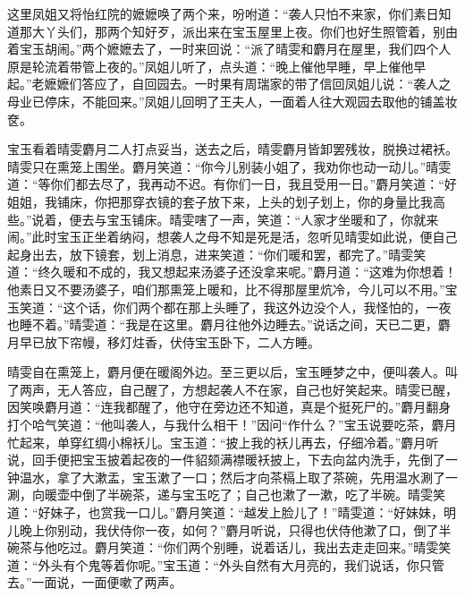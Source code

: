 这里凤姐又将怡红院的嬷嬷唤了两个来，吩咐道：``袭人只怕不来家，你们素日知道那大丫头们，那两个知好歹，派出来在宝玉屋里上夜。你们也好生照管着，别由着宝玉胡闹。''两个嬷嬷去了，一时来回说：``派了晴雯和麝月在屋里，我们四个人原是轮流着带管上夜的。''凤姐儿听了，点头道：``晚上催他早睡，早上催他早起。''老嬷嬷们答应了，自回园去。一时果有周瑞家的带了信回凤姐儿说：``袭人之母业已停床，不能回来。''凤姐儿回明了王夫人，一面着人往大观园去取他的铺盖妆奁。

宝玉看着晴雯麝月二人打点妥当，送去之后，晴雯麝月皆卸罢残妆，脱换过裙袄。晴雯只在熏笼上围坐。麝月笑道：``你今儿别装小姐了，我劝你也动一动儿。''晴雯道：``等你们都去尽了，我再动不迟。有你们一日，我且受用一日。''麝月笑道：``好姐姐，我铺床，你把那穿衣镜的套子放下来，上头的划子划上，你的身量比我高些。''说着，便去与宝玉铺床。晴雯嗐了一声，笑道：``人家才坐暖和了，你就来闹。''此时宝玉正坐着纳闷，想袭人之母不知是死是活，忽听见晴雯如此说，便自己起身出去，放下镜套，划上消息，进来笑道：``你们暖和罢，都完了。''晴雯笑道：``终久暖和不成的，我又想起来汤婆子还没拿来呢。''麝月道：``这难为你想着！他素日又不要汤婆子，咱们那熏笼上暖和，比不得那屋里炕冷，今儿可以不用。''宝玉笑道：``这个话，你们两个都在那上头睡了，我这外边没个人，我怪怕的，一夜也睡不着。''晴雯道：``我是在这里。麝月往他外边睡去。''说话之间，天已二更，麝月早已放下帘幔，移灯炷香，伏侍宝玉卧下，二人方睡。

晴雯自在熏笼上，麝月便在暖阁外边。至三更以后，宝玉睡梦之中，便叫袭人。叫了两声，无人答应，自己醒了，方想起袭人不在家，自己也好笑起来。晴雯已醒，因笑唤麝月道：``连我都醒了，他守在旁边还不知道，真是个挺死尸的。''麝月翻身打个哈气笑道：``他叫袭人，与我什么相干！''因问``作什么？''宝玉说要吃茶，麝月忙起来，单穿红绸小棉袄儿。宝玉道：``披上我的袄儿再去，仔细冷着。''麝月听说，回手便把宝玉披着起夜的一件貂颏满襟暖袄披上，下去向盆内洗手，先倒了一钟温水，拿了大漱盂，宝玉漱了一口；然后才向茶槅上取了茶碗，先用温水涮了一涮，向暖壶中倒了半碗茶，递与宝玉吃了；自己也漱了一漱，吃了半碗。晴雯笑道：``好妹子，也赏我一口儿。''麝月笑道：``越发上脸儿了！''晴雯道：``好妹妹，明儿晚上你别动，我伏侍你一夜，如何？''麝月听说，只得也伏侍他漱了口，倒了半碗茶与他吃过。麝月笑道：``你们两个别睡，说着话儿，我出去走走回来。''晴雯笑道：``外头有个鬼等着你呢。''宝玉道：``外头自然有大月亮的，我们说话，你只管去。''一面说，一面便嗽了两声。

